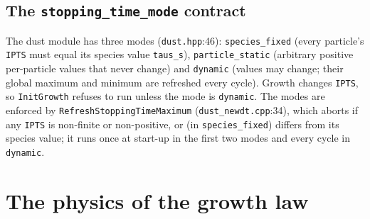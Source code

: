 \documentclass[11pt]{article}
\newcommand{\code}[1]{\texttt{#1}}
\newcommand{\file}[1]{\texttt{\small #1}}
\newcommand{\fn}[1]{\texttt{\small #1}}
\begin{document}
\subsection{The \code{stopping\_time\_mode} contract}
The dust module has three modes (\file{dust.hpp}:46):
\code{species\_fixed} (every particle's \code{IPTS} must equal its species value
\code{taus\_s}), \code{particle\_static} (arbitrary positive per-particle values that
never change) and \code{dynamic} (values may change; their global maximum and minimum
are refreshed every cycle). Growth changes \code{IPTS}, so \fn{InitGrowth} refuses to
run unless the mode is \code{dynamic}. The modes are enforced by
\fn{RefreshStoppingTimeMaximum} (\file{dust\_newdt.cpp}:34), which aborts if any
\code{IPTS} is non-finite or non-positive, or (in \code{species\_fixed}) differs from its
species value; it runs once at start-up in the first two modes and every cycle in
\code{dynamic}.

\section{The physics of the growth law}\label{sec:physics}
\end{document}
